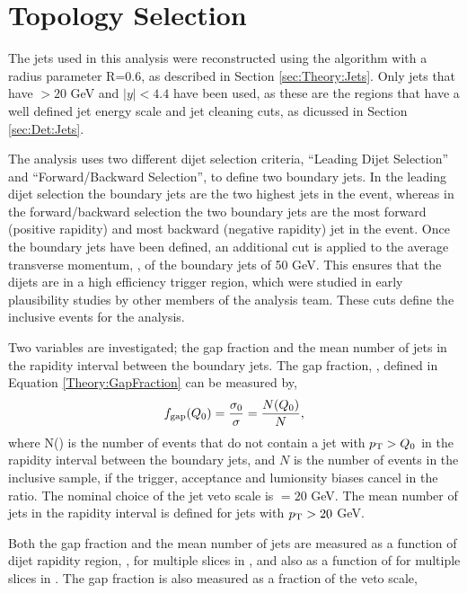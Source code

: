 \section{Topology Selection}
\label{sec:GBJ1:AnalSel}

The jets used in this analysis were reconstructed using the \antikt{} algorithm with a radius parameter R=0.6, as described in Section \ref{sec:Theory:Jets}.
Only jets that have \pt{}$>20$ GeV and $|y|<4.4$ have been used, as these are the regions that have a well defined jet energy scale and jet cleaning cuts, as dicussed in Section \ref{sec:Det:Jets}. 

The analysis uses two different dijet selection criteria, ``Leading \pt{} Dijet Selection'' and ``Forward/Backward Selection'', to define two boundary jets. 
In the leading dijet \pt{} selection the boundary jets are the two highest \pt{} jets in the event, whereas in the forward/backward selection the two boundary jets are the most forward (positive rapidity) and most backward (negative rapidity) jet in the event. 
Once the boundary jets have been defined, an additional cut is applied to the average transverse momentum, \ptb{}, of the boundary jets of 50 GeV. 
This ensures that the dijets are in a high efficiency trigger region, which were studied in early plausibility studies \cite{ref:GBJConf} by other members of the analysis team. 
These cuts define the inclusive events for the analysis. 


Two variables are investigated; the gap fraction and the mean  number of jets in the rapidity interval between the boundary jets. 
The gap fraction, \gap, defined in Equation \ref{Theory:GapFraction} can be measured by,
\begin{equation}
f_{\rm gap}(\mbox{$Q_0$}{}) = \frac{\sigma_{0}}{\sigma} =  \frac{N (\mbox{$Q_0$}{})}{N},
\label{GBJ1:fgap}
\end{equation}
where N(\qz{}) is the number of events that do not contain a jet with $\mbox{$p_{\rm T}$}{}>\mbox{$Q_0$}{}$ in the rapidity interval between the boundary jets, and $N$ is the number of events in the inclusive sample, if the trigger, acceptance and lumionsity biases cancel in the ratio.
The nominal choice of the jet veto scale is \qz{}$=20$ GeV. 
The mean number of jets in the rapidity interval is defined for jets with $\mbox{$p_{\rm T}$}{}>20$ GeV. 

Both the gap fraction and the mean number of jets are measured as a function of dijet rapidity region, \dy{}, for multiple slices in \ptb{}, and also as a function of \ptb{} for multiple slices in \dy{}. 
The gap fraction is also measured as a fraction of the veto scale, \qz{}
